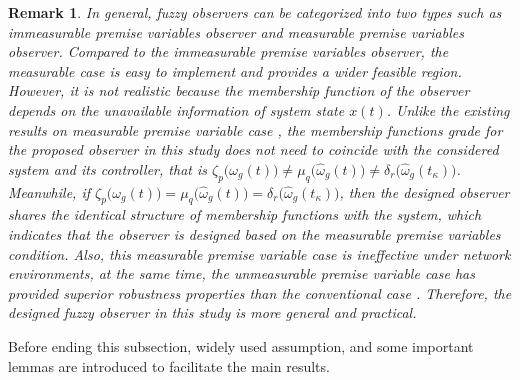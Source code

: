 \documentclass[preprint,11pt]{elsarticle}
\newtheorem{remark}{Remark}
\begin{document}
\vspace{-0.4cm}
\begin{remark}
{In general, fuzzy observers can be categorized into two types such as immeasurable premise variables observer and measurable premise variables observer. Compared to the immeasurable premise variables observer, the measurable case is easy to implement and provides a wider feasible region. However, it is not realistic because the membership function of the observer depends on the unavailable information of system state $x(t)$. Unlike the existing results on measurable premise variable case \cite{sara1,vino1,prakash1}, the membership functions grade for the proposed observer in this study does not need to coincide with the considered system and its controller, that is $\zeta_p\big( \omega_g(t) \big)\neq\mu_q\big( \hat{\omega}_g(t) \big)\neq\delta_r\big( \hat{\omega}_g(t_\kappa) \big)$. Meanwhile, if $\zeta_p\big( \omega_g(t) \big)=\mu_q\big( \hat{\omega}_g(t) \big)=\delta_r\big( \hat{\omega}_g(t_\kappa) \big)$, then the designed observer shares the identical structure of membership functions with the system, which indicates that the observer is designed based on the measurable premise variables condition. Also, this measurable premise variable case is ineffective under network environments, at the same time, the unmeasurable premise variable case has provided superior robustness properties than the conventional case \cite{pengc}. Therefore, the designed fuzzy observer in this study is more general and practical. }
\end{remark}
Before ending this subsection, widely used assumption, and some important lemmas are introduced to facilitate the main results.
\end{document}
